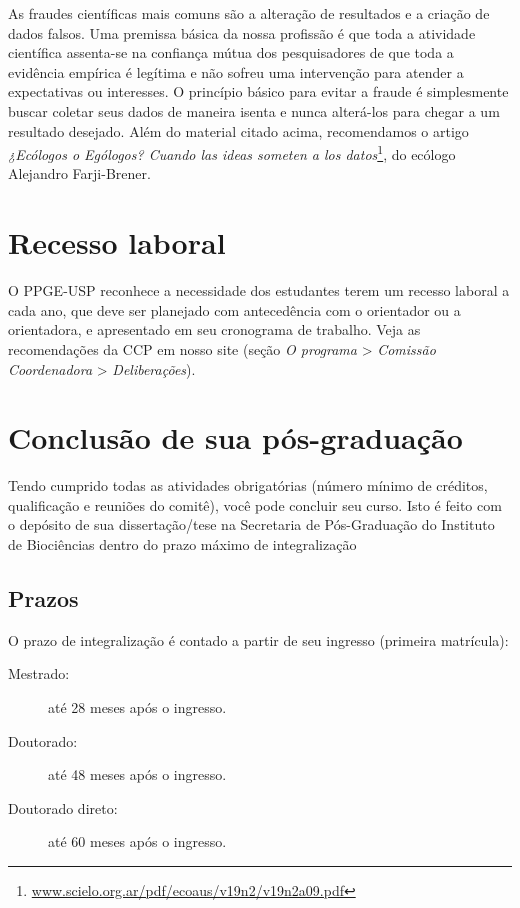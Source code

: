 As fraudes científicas mais comuns são a alteração de resultados e a
criação de dados falsos. Uma premissa básica da nossa profissão é que
toda a atividade científica assenta-se na confiança mútua dos
pesquisadores de que toda a evidência empírica é legítima e não sofreu
uma intervenção para atender a expectativas ou interesses. O princípio
básico para evitar a fraude é simplesmente buscar coletar seus dados
de maneira isenta e nunca alterá-los para chegar a um resultado
desejado.  Além do material citado acima, recomendamos o artigo
\emph{¿Ecólogos o Ególogos? Cuando las ideas someten a los
  datos}\footnote{\url{www.scielo.org.ar/pdf/ecoaus/v19n2/v19n2a09.pdf}},
do ecólogo Alejandro Farji-Brener.

\section{Recesso laboral}
\label{sec:recesso-laboral}
O PPGE-USP reconhece a necessidade dos estudantes terem um recesso
laboral a cada ano, que deve ser planejado com antecedência com o
orientador ou a orientadora, e apresentado em seu
cronograma de trabalho. Veja as recomendações da CCP em nosso site
(seção \emph{O programa} \textgreater{} \emph{Comissão Coordenadora}
\textgreater{} \emph{Deliberações}).

\section{Conclusão de sua pós-graduação}
\label{sec:conclusao}

Tendo cumprido todas as atividades obrigatórias (número mínimo de
créditos, qualificação e reuniões do comitê), você pode concluir seu
curso. Isto é feito com o depósito de sua dissertação/tese na
Secretaria de Pós-Graduação do Instituto de Biociências dentro do
prazo máximo de integralização

\subsection{Prazos}

O prazo de integralização é contado a partir de seu ingresso
(primeira matrícula):

\begin{description}
\item[Mestrado:] até 28 meses após o ingresso.
\item[Doutorado:] até 48 meses após o ingresso.
\item[Doutorado direto:] até 60 meses após o ingresso.
\end{description}

